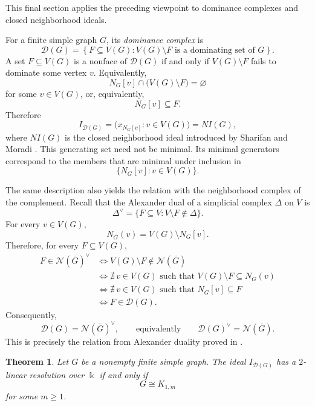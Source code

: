 \documentclass[11pt]{amsart}
\newtheorem{theorem}{Theorem}[section]
\theoremstyle{definition}
\theoremstyle{remark}
\numberwithin{equation}{section}
\newcommand{\NN}{\mathcal N}
\newcommand{\DD}{\mathcal D}
\begin{document}
	This final section applies the preceding viewpoint to dominance complexes and
	closed neighborhood ideals.
	
	For a finite simple graph \(G\), its \emph{dominance complex} is
	\[
	\DD(G)
	=
	\left\{
	F\subseteq V(G):
	V(G)\setminus F
	\text{ is a dominating set of }G
	\right\}.
	\]
	A set \(F\subseteq V(G)\) is a nonface of \(\DD(G)\) if and only if
	\(V(G)\setminus F\) fails to dominate some vertex \(v\). Equivalently,
	\[
	N_G[v]\cap\bigl(V(G)\setminus F\bigr)=\varnothing
	\]
	for some \(v\in V(G)\), or, equivalently,
	\[
	N_G[v]\subseteq F.
	\]
	Therefore
	\begin{equation}\label{eq:dominance-closed-neighborhood}
		I_{\DD(G)}
		=
		\bigl(x_{N_G[v]}:v\in V(G)\bigr)
		=
		NI(G),
	\end{equation}
	where \(NI(G)\) is the closed neighborhood ideal introduced by Sharifan
	and Moradi \cite[Definition~2.1]{SharifanMoradi2020}. This generating set need
	not be minimal. Its minimal generators correspond to the members that are minimal
	under inclusion in
	\[
	\{N_G[v]:v\in V(G)\}.
	\]
	
	The same description also yields the relation with the neighborhood complex
	of the complement. Recall that the Alexander dual of a simplicial complex
	\(\Delta\) on \(V\) is
	\[
	\Delta^\vee=\{F\subseteq V:V\setminus F\notin\Delta\}.
	\]
	For every \(v\in V(G)\),
	\[
	N_{\overline G}(v)=V(G)\setminus N_G[v].
	\]
	Therefore, for every \(F\subseteq V(G)\),
	\begin{align*}
		F\in\NN(\overline G)^\vee
		&\Longleftrightarrow
		V(G)\setminus F\notin\NN(\overline G)\\
		&\Longleftrightarrow
		\nexists\,v\in V(G)
		\text{ such that }
		V(G)\setminus F\subseteq N_{\overline G}(v)\\
		&\Longleftrightarrow
		\nexists\,v\in V(G)
		\text{ such that }
		N_G[v]\subseteq F\\
		&\Longleftrightarrow
		F\in\DD(G).
	\end{align*}
	Consequently,
	\[
	\DD(G)=\NN(\overline G)^\vee,
	\qquad\text{equivalently}\qquad
	\DD(G)^\vee=\NN(\overline G).
	\]
	This is precisely the relation from Alexander duality proved in
	\cite[Theorem~1.1]{MatsushitaWakatsuki2025}.
	
	\begin{theorem}\label{thm:dominance-star}
		Let \(G\) be a nonempty finite simple graph. The ideal \(I_{\DD(G)}\)
		has a \(2\)-linear resolution over \(\Bbbk\) if and only if
		\[
		G\cong K_{1,m}
		\]
		for some \(m\ge1\).
	\end{theorem}
	
\end{document}
